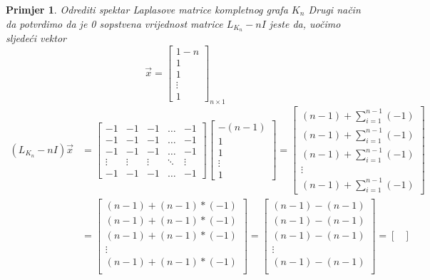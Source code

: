 \documentclass[11pt]{article}
\newtheorem{example}{Primjer}
\begin{document}
\begin{example}{Odrediti spektar Laplasove matrice kompletnog grafa $K_n$}
	Drugi način da potvrdimo da je 0 sopstvena vrijednost matrice $L_{K_n} - n I$ jeste da, uočimo sljedeći vektor
	\[
	\vec{x} =
	\begin{bmatrix}
	 1-n \\ 
	1 \\
	1 \\
	\vdots \\
	1
	\end{bmatrix}_{n \times 1}
	\]
	\[
	\begin{split}
	(L_{K_n} - nI) \vec{x} &= 
	\begin{bmatrix}
	-1 & -1 & -1 & \dots & -1 \\
	-1 & -1 & -1 & \dots & -1 \\
	-1 & -1 & -1 & \dots & -1 \\
	\vdots & \vdots & \vdots & \ddots & \vdots \\
	-1 & -1 & -1 & \dots & -1
	\end{bmatrix}
	\begin{bmatrix}
	-(n-1) \\
	1 \\
	1 \\
	\vdots \\
	1
	\end{bmatrix}
	 = 
	\begin{bmatrix}
	(n-1) + \sum_{i=1}^{n-1} (-1) \\
	(n-1) + \sum_{i=1}^{n-1} (-1) \\
	(n-1) + \sum_{i=1}^{n-1} (-1) \\
	\vdots \\
	(n-1) + \sum_{i=1}^{n-1} (-1)
	\end{bmatrix}  \\
	& =
	\begin{bmatrix}
	(n-1) + (n-1) * (-1) \\
	(n-1) + (n-1) * (-1) \\
	(n-1) + (n-1) * (-1) \\
	\vdots \\
	(n-1) + (n-1) * (-1) \\
	\end{bmatrix}
	=
	\begin{bmatrix}
	(n-1) - (n-1) \\
	(n-1) - (n-1) \\
	(n-1) - (n-1) \\
	\vdots \\
	(n-1) - (n-1) \\
	\end{bmatrix}
	 =
	\begin{bmatrix}

\end{bmatrix}
\end{split}\]
\end{example}
\end{document}
